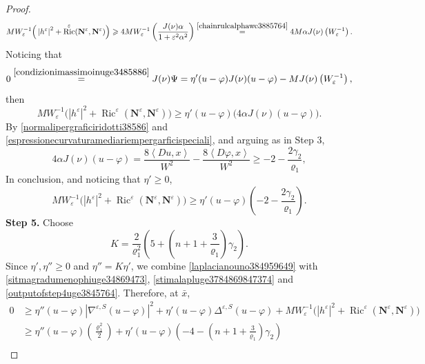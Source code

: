 \documentclass[11pt]{amsart}
\renewcommand{\geq}{\geqslant}
\newcommand{\n}[1]{\nabla^\varepsilon_{ #1 }}
\newcommand{\vh}{\nu}
\newcommand{\eps}{\varepsilon}
\newcommand{\W}{W}
\newcommand{\We}{W_\eps}
\renewcommand{\n}{\mathbf{N}}
\DeclareMathOperator{\ric}{Ric}
\theoremstyle{definition}
\theoremstyle{remark}
\numberwithin{equation}{section}
\begin{document}
\begin{proof}
\begin{equation*}
        M\We^{-1}\Big(\left|h^\eps\right|^2+\ric^\eps(\n^\eps,\n^\eps)\Big)\geq 4M\We^{-1}\left(\frac{J(\vh)\alpha}{1+\eps^2\alpha^2}\right)\overset{\eqref{chainrulealphawe3885764}}{=}4M\alpha J(\vh)\left(\We^{-1}\right).
    \end{equation*}
    Noticing that 
    \begin{equation*}
        0\overset{\eqref{condizionimassimoinuge3485886}}{=}J(\vh)\Psi=\eta'(u-\varphi)J(\vh)(u-\varphi)-MJ(\vh)\left(\We^{-1}\right),
    \end{equation*}
    then 
    \begin{equation*}
        M\We^{-1}\Big(\left|h^\eps\right|^2+\ric^\eps(\n^\eps,\n^\eps)\Big)\geq \eta'(u-\varphi)\big(4\alpha J(\vh)(u-\varphi)\big).
    \end{equation*}
    By \eqref{normalipergraficiridotti38586} and \eqref{espressionecurvaturamediariempergarficispeciali}, and arguing as in Step 3,
    \begin{equation*}
        4\alpha J(\vh)(u-\varphi)=\frac{8\left\langle Du,x\right\rangle}{\W^2}-\frac{8\left\langle D\varphi,x\right\rangle}{\W^2}\geq -2-\frac{2\gamma_2}{\varrho_1},
    \end{equation*}
    In conclusion, and noticing that $\eta'\geq 0$, 
    \begin{equation}\label{outputofstep4uge3845764}
        M\We^{-1}\Big(\left|h^\eps\right|^2+\ric^\eps(\n^\eps,\n^\eps)\Big)\geq \eta'(u-\varphi)\left(-2-\frac{2\gamma_2}{\varrho_1}\right).
    \end{equation}
    \noindent \textbf{Step 5.} 
    Choose
    \begin{equation*}
        K=\frac{2}{\varrho_1^2}\left(5+\left(n+1+\frac{3}{\varrho_1}\right)\gamma_2\right).
    \end{equation*}
    Since $\eta',\eta''\geq 0$ and $\eta''=K\eta'$, we combine \eqref{laplacianouno384959649} with \eqref{sitmagradumenophiuge34869473}, \eqref{stimalapluge3784869847374} and \eqref{outputofstep4uge3845764}. Therefore, at $\bar x$, 
    \begin{equation*}
    \begin{split}
          0&\geq \eta''(u-\varphi)|\nabla^{\eps,S}(u-\varphi)|^2+\eta'(u-\varphi)\Delta^{\eps,S}(u-\varphi)+M\We^{-1}\Big(\left|h^\eps\right|^2+\ric^\eps(\n^\eps,\n^\eps)\Big)\\
          &\geq  \eta''(u-\varphi)\left(\frac{\varrho_1^2}{2}\right)+\eta'(u-\varphi)\left(-4-\left(n+1+\frac{3}{\varrho_1}\right)\gamma_2\right)\\

\end{split}
\end{equation*}
\end{proof}
\end{document}
